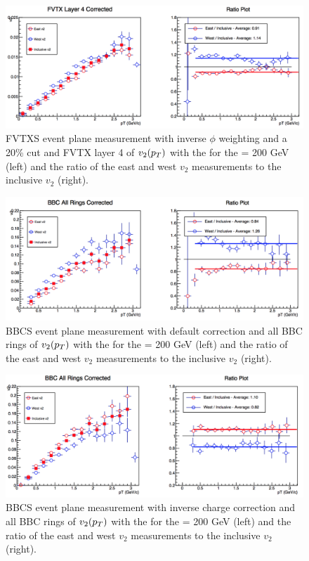 \begin{figure}

\includegraphics[width=0.65\linewidth]{figs/fvtx_4_data_cut.png}
\caption{FVTXS event plane measurement with inverse $\phi$ weighting and a 20\% cut and FVTX layer 4 of $v_{2}(\mbox{$p_T$})$ with the  for the \pau \sqsn = 200 GeV (left) and the ratio of the east and west $v_2$ measurements to the inclusive $v_2$ (right).}
\end{figure}

\begin{figure}

\includegraphics[width=0.65\linewidth]{figs/bbc_all_default.png}
\caption{BBCS event plane measurement with default correction and all BBC rings of $v_{2}(\mbox{$p_T$})$ with the  for the \pau \sqsn = 200 GeV (left) and the ratio of the east and west $v_2$ measurements to the inclusive $v_2$ (right).}
\end{figure}

\begin{figure}

\includegraphics[width=0.65\linewidth]{figs/bbc_all_data.png}
\caption{BBCS event plane measurement with inverse charge correction and all BBC rings of $v_{2}(\mbox{$p_T$})$ with the  for the \pau \sqsn = 200 GeV (left) and the ratio of the east and west $v_2$ measurements to the inclusive $v_2$ (right).}
\end{figure}

